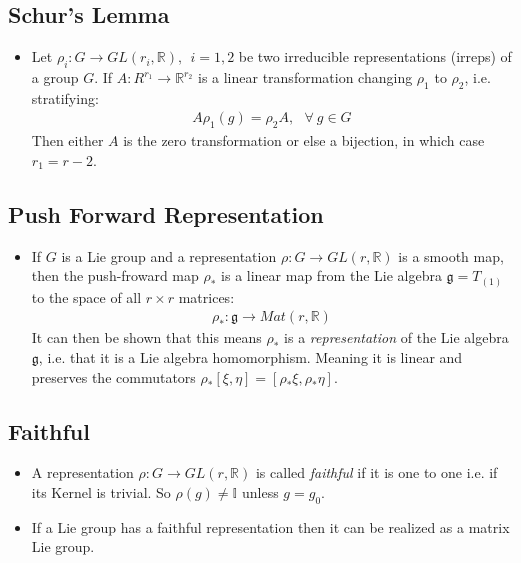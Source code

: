 \documentclass[11pt]{article}
\numberwithin{equation}{section}
\DeclareRobustCommand{\RR}{\mathbb{R}}
\begin{document}
\subsection{Schur's Lemma}
\begin{itemize}
  \item Let $\rho_{i}: G \rightarrow GL(r_i,\RR),~~i=1,2$ be two irreducible representations (irreps) of a group $G$. If $A:R^{r_1} \rightarrow \RR^{r_2}$ is a linear transformation changing $\rho_1$ to $\rho_2$, i.e. stratifying:
  \begin{align*}
    A \rho_1(g) = \rho_2A,~~~\forall~g\in G
  \end{align*}
  Then either $A$ is the zero transformation or else a bijection, in which case $r_1=r-2$. 
\end{itemize}

\subsection{Push Forward Representation}
\begin{itemize}
  \item If $G$ is a Lie group and a representation $\rho: G \rightarrow GL(r,\RR)$ is a smooth map, then the push-froward map $\rho_{\ast}$ is a linear map from the Lie algebra $\mathfrak{g} = T_{(1)}$ to the space of all $r\times r$ matrices:
  \begin{align*}
    \rho_{\ast}: \mathfrak{g}\rightarrow Mat(r,\RR) 
  \end{align*}
  It can then be shown that this means $\rho_{\ast}$ is a \emph{representation} of the Lie algebra $\mathfrak{g}$, i.e. that it is a Lie algebra homomorphism. Meaning it is linear and preserves the commutators $\rho_{\ast}[\xi,\eta] = [\rho_{\ast}\xi,\rho_{\ast}\eta]$.    
\end{itemize}


\subsection{Faithful}
\begin{itemize}
  \item A representation $\rho: G \rightarrow GL(r,\RR)$ is called \emph{faithful} if it is one to one i.e. if its Kernel is trivial. So $\rho(g) \neq \mathbb{I}$ unless $g=g_0$. 

   \item If a Lie group has a faithful representation then it can be realized as a matrix Lie group.   
\end{itemize}
\end{document}
